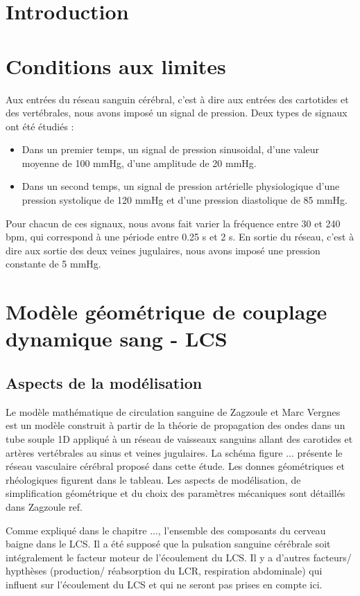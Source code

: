 \documentclass[french]{report}
\begin{document}
\section{Introduction}

\section{Conditions aux limites}
Aux entrées du réseau sanguin cérébral, c'est à dire aux entrées des cartotides et des vertébrales, nous avons imposé un signal de pression. Deux types de signaux ont été étudiés :
\begin{itemize}
\item Dans un premier temps, un signal de pression sinusoidal, d'une valeur moyenne de 100 mmHg, d'une amplitude de 20 mmHg.
\item Dans un second temps, un signal de pression artérielle physiologique d'une pression systolique de 120 mmHg et d'une pression diastolique de 85 mmHg.
\end{itemize}
Pour chacun de ces signaux, nous avons fait varier la fréquence entre 30 et 240 bpm, qui correspond à une période entre 0.25 s et 2 s.
En sortie du réseau, c'est à dire aux sortie des deux veines jugulaires, nous avons imposé une pression constante de 5 mmHg.

\section{Modèle géométrique de couplage dynamique sang - LCS}

\subsection{Aspects de la modélisation}

Le modèle mathématique de circulation sanguine de Zagzoule et Marc Vergnes est un modèle construit à partir de la théorie de propagation des ondes dans un tube souple 1D appliqué à un réseau de vaisseaux sanguins allant des carotides et artères vertébrales au sinus et veines jugulaires. La schéma figure ... présente le réseau vasculaire cérébral proposé dans cette étude. Les donnes géométriques et rhéologiques figurent dans le tableau. Les aspects de modélisation, de simplification géométrique et du choix des paramètres mécaniques sont détaillés dans Zagzoule ref.

Comme expliqué dans le chapitre ..., l'ensemble des composants du cerveau baigne dans le LCS. Il a été supposé que la pulsation sanguine cérébrale soit intégralement le facteur moteur de l'écoulement du LCS. Il y a d'autres facteurs/ hypthèses (production/ réabsorption du LCR, respiration abdominale) qui influent sur l'écoulement du LCS et qui ne seront pas prises en compte ici.
\end{document}
